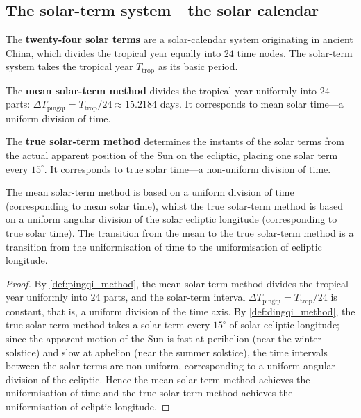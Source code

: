 \subsection{The solar-term system---the solar calendar}

\begin{definition}\label{def:solar_term_system}
The \textbf{twenty-four solar terms} are a solar-calendar system originating in ancient China, which divides the tropical year equally into \(24\) time nodes. The solar-term system takes the tropical year \(T_{\text{trop}}\) as its basic period.
\end{definition}

\begin{definition}\label{def:pingqi_method}
The \textbf{mean solar-term method} divides the tropical year uniformly into \(24\) parts: \(\Delta T_{\text{pingqi}}=T_{\text{trop}}/24\approx 15.2184\) days. It corresponds to mean solar time---a uniform division of time.
\end{definition}

\begin{definition}\label{def:dingqi_method}
The \textbf{true solar-term method} determines the instants of the solar terms from the actual apparent position of the Sun on the ecliptic, placing one solar term every \(15^\circ\). It corresponds to true solar time---a non-uniform division of time.
\end{definition}

\begin{proposition}\label{prop:pingqi_dingqi_comparison}
The mean solar-term method is based on a uniform division of time (corresponding to mean solar time), whilst the true solar-term method is based on a uniform angular division of the solar ecliptic longitude (corresponding to true solar time). The transition from the mean to the true solar-term method is a transition from the uniformisation of time to the uniformisation of ecliptic longitude.
\end{proposition}

\begin{proof}
By \cref{def:pingqi_method}, the mean solar-term method divides the tropical year uniformly into \(24\) parts, and the solar-term interval \(\Delta T_{\text{pingqi}}=T_{\text{trop}}/24\) is constant, that is, a uniform division of the time axis. By \cref{def:dingqi_method}, the true solar-term method takes a solar term every \(15^\circ\) of solar ecliptic longitude; since the apparent motion of the Sun is fast at perihelion (near the winter solstice) and slow at aphelion (near the summer solstice), the time intervals between the solar terms are non-uniform, corresponding to a uniform angular division of the ecliptic. Hence the mean solar-term method achieves the uniformisation of time and the true solar-term method achieves the uniformisation of ecliptic longitude.
\end{proof}

